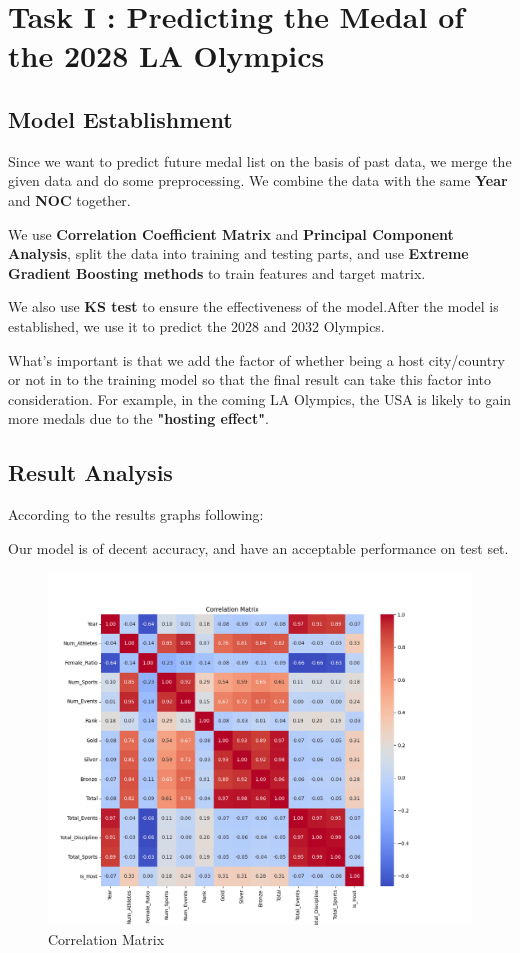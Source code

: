 \section{Task I : Predicting the Medal of the 2028 LA Olympics}
\subsection{Model Establishment}
Since we want to predict future medal list on the basis of past data, we merge the given data and do some preprocessing. 
We combine the data with the same \textbf{Year} and \textbf{NOC} together.

We use \textbf{Correlation Coefficient Matrix} and \textbf{Principal Component Analysis}, split the data
into training and testing parts, and use \textbf{Extreme Gradient Boosting methods} to train features
and target matrix.

We also use \textbf{KS test} to ensure the effectiveness of the model.After the model is established, we use it to predict the 2028 and 2032 Olympics.

What's important is that we add the factor of whether being a host city/country or not in to the training model so that the final result can take this factor into consideration. For example,
in the coming LA Olympics, the USA is likely to gain more medals due to the \textbf{"hosting effect"}.

\subsection{Result Analysis}


According to the results graphs following:

Our model is of decent accuracy, and have an acceptable performance on test set.


\begin{figure}[htbp]
    \centering
    \includegraphics[width=1\textwidth]{./figures/Cor_Matrix.png}
    \caption{Correlation Matrix}
    \label{fig:Cor_Matrix}
\end{figure}

